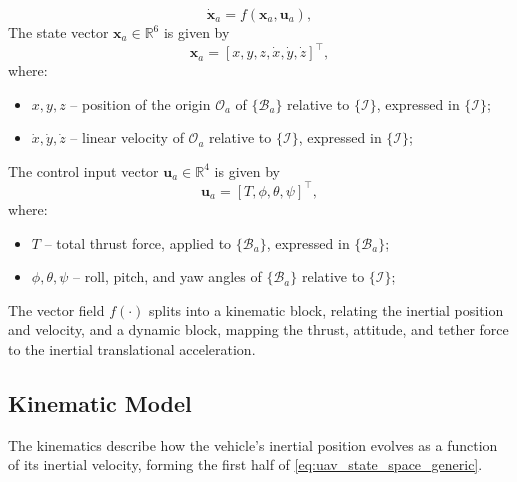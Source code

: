 \begin{equation}
    \label{eq:uav_state_space_generic}
    \dot{\mathbf{x}}_a = f(\mathbf{x}_a, \mathbf{u}_a),
\end{equation}
The state vector $\mathbf{x}_a \in \mathbb{R}^6$ is given by
\begin{equation}
    \label{eq:uav_state_vector}
    \mathbf{x}_a = [x, y, z, \dot{x}, \dot{y}, \dot{z}]^\top,
\end{equation}
where:
\begin{itemize}
    \item $x, y, z$ -- position of the origin $\mathcal{O}_a$ of $\{\mathcal{B}_a\}$ relative to $\{\mathcal{I}\}$, expressed in $\{\mathcal{I}\}$;
    \item $\dot{x}, \dot{y}, \dot{z}$ -- linear velocity of $\mathcal{O}_a$ relative to $\{\mathcal{I}\}$, expressed in $\{\mathcal{I}\}$;
\end{itemize}
The control input vector $\mathbf{u}_a \in \mathbb{R}^4$ is given by
\begin{equation}
    \label{eq:uav_input_vector}
    \mathbf{u}_a = [T, \phi, \theta, \psi]^\top,
\end{equation}
where:
\begin{itemize}
    \item $T$ -- total thrust force, applied to $\{\mathcal{B}_a\}$, expressed in $\{\mathcal{B}_a\}$;
    \item $\phi, \theta, \psi$ -- roll, pitch, and yaw angles of $\{\mathcal{B}_a\}$ relative to $\{\mathcal{I}\}$;
\end{itemize}

The vector field $f(\cdot)$ splits into a kinematic block, relating the inertial position and velocity, and a dynamic block, mapping the thrust, attitude, and tether force to the inertial translational acceleration.

\subsection{Kinematic Model}
\label{subsec:mod_uav_kinematics}
The kinematics describe how the vehicle's inertial position evolves as a function of its inertial velocity, forming the first half of \eqref{eq:uav_state_space_generic}.

